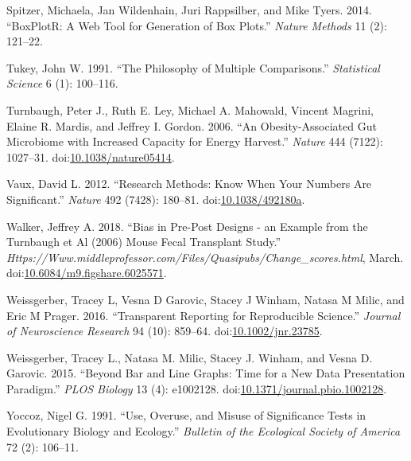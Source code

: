 \documentclass[fleqn,10pt,lineno]{wlpeerj} %
\theoremstyle{definition}
\theoremstyle{definition}
\theoremstyle{definition}
\theoremstyle{remark}
\begin{document}
\hypertarget{ref-Spitzer_BoxPlotR_2014}{}
Spitzer, Michaela, Jan Wildenhain, Juri Rappsilber, and Mike Tyers.
2014. ``BoxPlotR: A Web Tool for Generation of Box Plots.'' \emph{Nature
Methods} 11 (2): 121--22.

\hypertarget{ref-Tukey_Philosophy_1991}{}
Tukey, John W. 1991. ``The Philosophy of Multiple Comparisons.''
\emph{Statistical Science} 6 (1): 100--116.

\hypertarget{ref-Turnbaugh_obesityassociated_2006a}{}
Turnbaugh, Peter J., Ruth E. Ley, Michael A. Mahowald, Vincent Magrini,
Elaine R. Mardis, and Jeffrey I. Gordon. 2006. ``An Obesity-Associated
Gut Microbiome with Increased Capacity for Energy Harvest.''
\emph{Nature} 444 (7122): 1027--31.
doi:\href{https://doi.org/10.1038/nature05414}{10.1038/nature05414}.

\hypertarget{ref-Vaux_Research_2012}{}
Vaux, David L. 2012. ``Research Methods: Know When Your Numbers Are
Significant.'' \emph{Nature} 492 (7428): 180--81.
doi:\href{https://doi.org/10.1038/492180a}{10.1038/492180a}.

\hypertarget{ref-Walker_Bias_2018}{}
Walker, Jeffrey A. 2018. ``Bias in Pre-Post Designs - an Example from
the Turnbaugh et Al (2006) Mouse Fecal Transplant Study.''
\emph{Https://Www.middleprofessor.com/Files/Quasipubs/Change\_scores.html},
March.
doi:\href{https://doi.org/10.6084/m9.figshare.6025571}{10.6084/m9.figshare.6025571}.

\hypertarget{ref-Weissgerber_Transparent_2016}{}
Weissgerber, Tracey L, Vesna D Garovic, Stacey J Winham, Natasa M Milic,
and Eric M Prager. 2016. ``Transparent Reporting for Reproducible
Science.'' \emph{Journal of Neuroscience Research} 94 (10): 859--64.
doi:\href{https://doi.org/10.1002/jnr.23785}{10.1002/jnr.23785}.

\hypertarget{ref-Weissgerber_Bar_2015}{}
Weissgerber, Tracey L., Natasa M. Milic, Stacey J. Winham, and Vesna D.
Garovic. 2015. ``Beyond Bar and Line Graphs: Time for a New Data
Presentation Paradigm.'' \emph{PLOS Biology} 13 (4): e1002128.
doi:\href{https://doi.org/10.1371/journal.pbio.1002128}{10.1371/journal.pbio.1002128}.

\hypertarget{ref-Yoccoz_Use_1991}{}
Yoccoz, Nigel G. 1991. ``Use, Overuse, and Misuse of Significance Tests
in Evolutionary Biology and Ecology.'' \emph{Bulletin of the Ecological
Society of America} 72 (2): 106--11.
\end{document}

